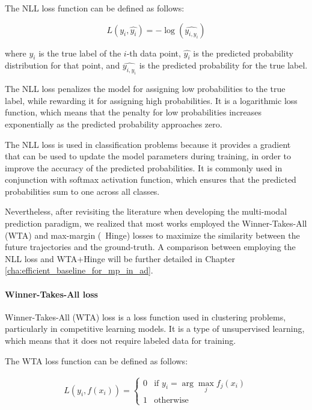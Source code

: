 The NLL loss function can be defined as follows:

\begin{equation}
	L(y_i, \hat{y_i}) = -\log(\hat{y_{i,y_i}})
\end{equation}

where $y_i$ is the true label of the $i$-th data point, $\hat{y_i}$ is the predicted probability distribution for that point, and $\hat{y_{i,y_i}}$ is the predicted probability for the true label.

The NLL loss penalizes the model for assigning low probabilities to the true label, while rewarding it for assigning high probabilities. It is a logarithmic loss function, which means that the penalty for low probabilities increases exponentially as the predicted probability approaches zero.

The NLL loss is used in classification problems because it provides a gradient that can be used to update the model parameters during training, in order to improve the accuracy of the predicted probabilities. It is commonly used in conjunction with softmax activation function, which ensures that the predicted probabilities sum to one across all classes.

Nevertheless, after revisiting the literature when developing the multi-modal prediction paradigm, we realized that most works employed the Winner-Takes-All (WTA) and max-margin (\aka \ Hinge) losses to maximize the similarity between the future trajectories and the ground-truth. A comparison between employing the NLL loss and WTA+Hinge will be further detailed in Chapter \ref{cha:efficient_baseline_for_mp_in_ad}.

\paragraph{Winner-Takes-All loss}
\label{par:3_WTA_loss}

Winner-Takes-All (WTA) loss is a loss function used in clustering problems, particularly in competitive learning models. It is a type of unsupervised learning, which means that it does not require labeled data for training.

The WTA loss function can be defined as follows:

\begin{equation}
\begin{split}
	L(y_i, f(x_i)) = \begin{cases}
		0 & \text{if } y_i = \arg\max_j f_j(x_i) \\
		1 & \text{otherwise} \
	\end{cases}
\end{split}
\end{equation}

